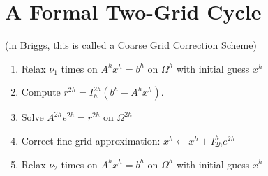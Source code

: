\documentclass[11pt]{article}
\providecommand{\tightlist}{%
      \setlength{\itemsep}{0pt}\setlength{\parskip}{0pt}}
\begin{document}
    \hypertarget{a-formal-two-grid-cycle}{%
\section{A Formal Two-Grid Cycle}\label{a-formal-two-grid-cycle}}

(in Briggs, this is called a Coarse Grid Correction Scheme)

\begin{enumerate}
\def\labelenumi{\arabic{enumi}.}
\tightlist
\item
  Relax \(\nu_1\) times on \(A^h x^h = b^h\) on \(\Omega^h\) with
  initial guess \(x^h\)
\item
  Compute \(r^{2h} = I_h^{2h}(b^h - A^h x^h)\).
\item
  Solve \(A^{2h} e^{2h} = r^{2h}\) on \(\Omega^{2h}\)
\item
  Correct fine grid approximation:
  \(x^h \leftarrow x^h + I_{2h}^h e^{2h}\)
\item
  Relax \(\nu_2\) times on \(A^h x^h = b^h\) on \(\Omega^h\) with
  initial guess \(x^h\)
\end{enumerate}
\end{document}
